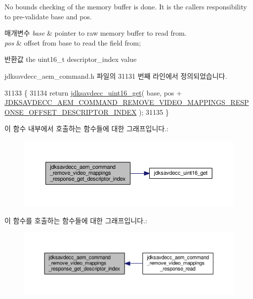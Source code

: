 No bounds checking of the memory buffer is done. It is the caller\textquotesingle{}s responsibility to pre-\/validate base and pos.


\begin{DoxyParams}{매개변수}
{\em base} & pointer to raw memory buffer to read from. \\
\hline
{\em pos} & offset from base to read the field from; \\
\hline
\end{DoxyParams}
\begin{DoxyReturn}{반환값}
the uint16\+\_\+t descriptor\+\_\+index value 
\end{DoxyReturn}


jdksavdecc\+\_\+aem\+\_\+command.\+h 파일의 31131 번째 라인에서 정의되었습니다.


\begin{DoxyCode}
31133 \{
31134     \textcolor{keywordflow}{return} \hyperlink{group__endian_ga3fbbbc20be954aa61e039872965b0dc9}{jdksavdecc\_uint16\_get}( base, pos + 
      \hyperlink{group__command__remove__video__mappings__response_ga7535218248ef9f465ef81cff9065e2d1}{JDKSAVDECC\_AEM\_COMMAND\_REMOVE\_VIDEO\_MAPPINGS\_RESPONSE\_OFFSET\_DESCRIPTOR\_INDEX}
       );
31135 \}
\end{DoxyCode}


이 함수 내부에서 호출하는 함수들에 대한 그래프입니다.\+:
\nopagebreak
\begin{figure}[H]
\begin{center}
\leavevmode
\includegraphics[width=350pt]{group__command__remove__video__mappings__response_gaca85ac2717b085424bc704f6576f48d9_cgraph}
\end{center}
\end{figure}




이 함수를 호출하는 함수들에 대한 그래프입니다.\+:
\nopagebreak
\begin{figure}[H]
\begin{center}
\leavevmode
\includegraphics[width=350pt]{group__command__remove__video__mappings__response_gaca85ac2717b085424bc704f6576f48d9_icgraph}
\end{center}
\end{figure}



